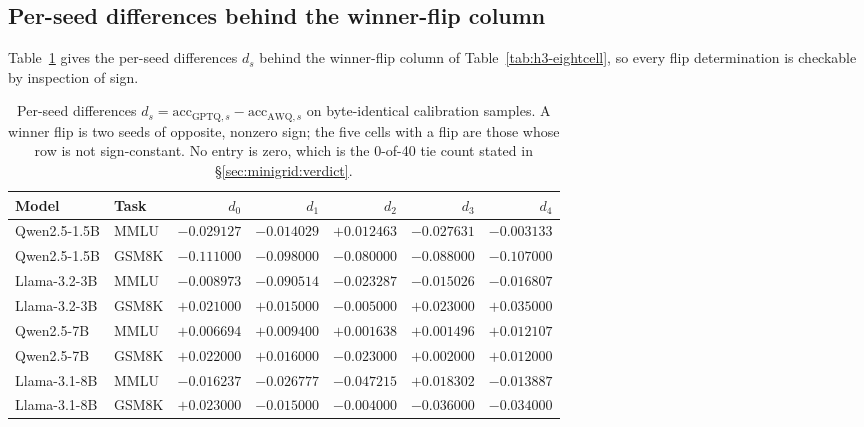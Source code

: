 \subsection{Per-seed differences behind the winner-flip column}
\label{app:minigrid:ds}

Table~\ref{tab:h3-ds} gives the per-seed differences $d_s$ behind the
winner-flip column of Table~\ref{tab:h3-eightcell}, so every flip determination
is checkable by inspection of sign.

\begin{table}[!t]
\centering
\small
\caption{Per-seed differences $d_s = \mathrm{acc}_{\mathrm{GPTQ},s} -
\mathrm{acc}_{\mathrm{AWQ},s}$ on byte-identical calibration samples. A winner
flip is two seeds of opposite, nonzero sign; the five cells with a flip are
those whose row is not sign-constant. No entry is zero, which is the 0-of-40 tie
count stated in \S\ref{sec:minigrid:verdict}.}
\label{tab:h3-ds}
\setlength{\tabcolsep}{2pt}
\small
\begin{tabular}{llrrrrr}
\toprule
Model & Task & $d_0$ & $d_1$ & $d_2$ & $d_3$ & $d_4$ \\
\midrule
Qwen2.5-1.5B & MMLU  & $-0.029127$ & $-0.014029$ & $+0.012463$ & $-0.027631$ & $-0.003133$ \\
Qwen2.5-1.5B & GSM8K & $-0.111000$ & $-0.098000$ & $-0.080000$ & $-0.088000$ & $-0.107000$ \\
Llama-3.2-3B & MMLU  & $-0.008973$ & $-0.090514$ & $-0.023287$ & $-0.015026$ & $-0.016807$ \\
Llama-3.2-3B & GSM8K & $+0.021000$ & $+0.015000$ & $-0.005000$ & $+0.023000$ & $+0.035000$ \\
Qwen2.5-7B   & MMLU  & $+0.006694$ & $+0.009400$ & $+0.001638$ & $+0.001496$ & $+0.012107$ \\
Qwen2.5-7B   & GSM8K & $+0.022000$ & $+0.016000$ & $-0.023000$ & $+0.002000$ & $+0.012000$ \\
Llama-3.1-8B & MMLU  & $-0.016237$ & $-0.026777$ & $-0.047215$ & $+0.018302$ & $-0.013887$ \\
Llama-3.1-8B & GSM8K & $+0.023000$ & $-0.015000$ & $-0.004000$ & $-0.036000$ & $-0.034000$ \\
\bottomrule
\end{tabular}
\end{table}

